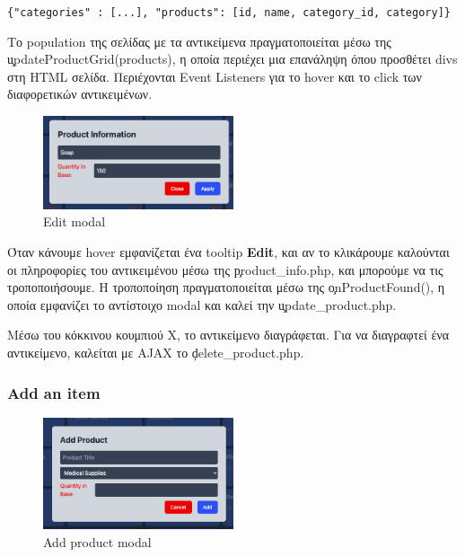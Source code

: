         \begin{graycomment}
            \verb|{"categories" : [...], "products": [id, name, category_id, category]}|
        \end{graycomment}

        Το population της σελίδας με τα αντικείμενα πραγματοποιείται μέσω της \c{updateProductGrid(products)}, η οποία περιέχει μια επανάληψη όπου προσθέτει divs στη HTML σελίδα.
        Περιέχονται Event Listeners για το hover και το click των διαφορετικών αντικειμένων.

        \begin{figure}[H] \noindent \centering
            \includegraphics[width=0.5\textwidth]{img/admin-base-edit}
            \caption{Edit modal}
        \end{figure}

        Όταν κάνουμε hover εμφανίζεται ένα tooltip \textbf{Edit}, και αν το κλικάρουμε καλούνται οι πληροφορίες του αντικειμένου μέσω της \c{product\_info.php}, και μπορούμε να τις τροποποιήσουμε.
        Η τροποποίηση πραγματοποιείται μέσω της \c{onProductFound()}, η οποία εμφανίζει το αντίστοιχο modal και καλεί την \c{update\_product.php}.

        Μέσω του κόκκινου κουμπιού Χ, το αντικείμενο διαγράφεται.
        Για να διαγραφτεί ένα αντικείμενο, καλείται με AJAX το \c{delete\_product.php}.

        \subsubsection{Add an item}
            \begin{figure}[H] \noindent \centering
                \includegraphics[width=0.5\textwidth]{img/admin-base-add}
                \caption{Add product modal}
            \end{figure}

